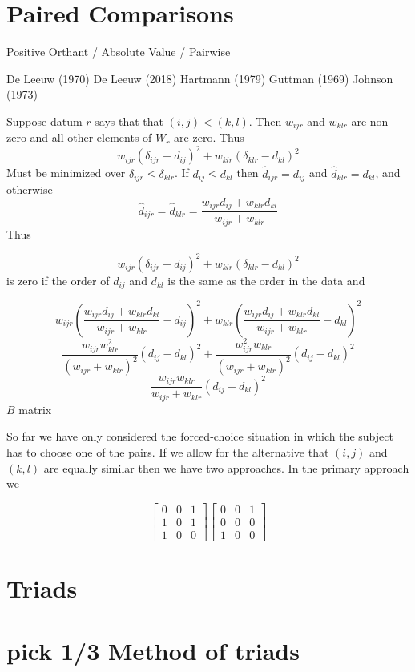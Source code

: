 \documentclass[
  12pt,
]{article}
\begin{document}
\section{Paired Comparisons}\label{paired-comparisons}

Positive Orthant / Absolute Value / Pairwise

De Leeuw (1970)
De Leeuw (2018)
Hartmann (1979)
Guttman (1969)
Johnson (1973)

Suppose datum \(r\) says that that \((i,j)<(k,l)\). Then \(w_{ijr}\) and \(w_{klr}\)
are non-zero and all other elements of \(W_r\) are zero.
Thus
\[
w_{ijr}(\delta_{ijr}-d_{ij})^2+w_{klr}(\delta_{klr}-d_{kl})^2
\]
Must be minimized over \(\delta_{ijr}\leq\delta_{klr}\). If \(d_{ij}\leq d_{kl}\)
then \(\hat d_{ijr}=d_{ij}\) and \(\hat d_{klr}=d_{kl}\), and otherwise
\[
\hat d_{ijr}=\hat d_{klr}=\frac{w_{ijr}d_{ij}+w_{klr}d_{kl}}{w_{ijr}+w_{klr}}
\]
Thus

\[w_{ijr}(\delta_{ijr}-d_{ij})^2+w_{klr}(\delta_{klr}-d_{kl})^2\]
is zero if the order of \(d_{ij}\) and \(d_{kl}\) is the same as the order in the data
and

\[
w_{ijr}(\frac{w_{ijr}d_{ij}+w_{klr}d_{kl}}{w_{ijr}+w_{klr}}-d_{ij})^2
+w_{klr}(\frac{w_{ijr}d_{ij}+w_{klr}d_{kl}}{w_{ijr}+w_{klr}}-d_{kl})^2
\]
\[
\frac{w_{ijr}w_{klr}^2}{(w_{ijr}+w_{klr})^2}(d_{ij}-d_{kl})^2+
\frac{w_{ijr}^2w_{klr}}{(w_{ijr}+w_{klr})^2}(d_{ij}-d_{kl})^2
\]
\[
\frac{w_{ijr}w_{klr}}{w_{ijr}+w_{klr}}(d_{ij}-d_{kl})^2
\]
\(B\) matrix

So far we have only considered the forced-choice situation in which
the subject has to choose one of the pairs. If we allow for the alternative
that \((i,j)\) and \((k,l)\) are equally similar then we have two approaches. In the primary approach we

\[
\begin{bmatrix}
0&0&1\\
1&0&1\\
1&0&0
\end{bmatrix}
\begin{bmatrix}
0&0&1\\
0&0&0\\
1&0&0
\end{bmatrix}
\]

\section{Triads}\label{triads}

\section{pick 1/3 Method of triads}\label{pick-13-method-of-triads}
\end{document}
